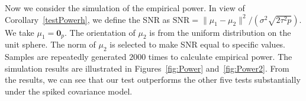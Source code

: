 \documentclass[3p]{elsarticle}
\theoremstyle{plain}
\theoremstyle{definition}
\theoremstyle{remark}
\begin{document}
Now we consider the simulation of the empirical power.
In view of Corollary~\ref{testPowerh}, we define the SNR as $\textrm{SNR}=\|\mu_1-\mu_2\|^2/(\sigma^2\sqrt{2\tau^2 p})$.
We take $\mu_1=\mathbf{0}_p$.
The orientation of $\mu_2$ is from the uniform distribution on the unit sphere.
The norm of $\mu_2$ is selected to make SNR equal to specific values.
Samples are repeatedly generated $2000$ times to calculate empirical power.
The simulation results are illustrated in Figures~\ref{fig:Power} and~\ref{fig:Power2}.
From the results, we can see that our test outperforms the other five tests substantially under the spiked covariance model.

\begin{figure}
    \centering 
    \\
\end{figure}
\end{document}
